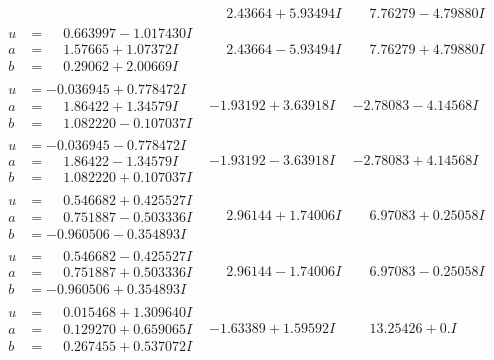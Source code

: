 \documentclass[1p]{elsarticle_modified}
\theoremstyle{definition}
\begin{document}
$$\begin{array}{c|c|c}
 & \phantom{-}2.43664 + 5.93494 I & \phantom{-}7.76279 - 4.79880 I \\ \hline\begin{aligned}
u &= \phantom{-}0.663997 - 1.017430 I \\
a &= \phantom{-}1.57665 + 1.07372 I \\
b &= \phantom{-}0.29062 + 2.00669 I\end{aligned}
 & \phantom{-}2.43664 - 5.93494 I & \phantom{-}7.76279 + 4.79880 I \\ \hline\begin{aligned}
u &= -0.036945 + 0.778472 I \\
a &= \phantom{-}1.86422 + 1.34579 I \\
b &= \phantom{-}1.082220 - 0.107037 I\end{aligned}
 & -1.93192 + 3.63918 I & -2.78083 - 4.14568 I \\ \hline\begin{aligned}
u &= -0.036945 - 0.778472 I \\
a &= \phantom{-}1.86422 - 1.34579 I \\
b &= \phantom{-}1.082220 + 0.107037 I\end{aligned}
 & -1.93192 - 3.63918 I & -2.78083 + 4.14568 I \\ \hline\begin{aligned}
u &= \phantom{-}0.546682 + 0.425527 I \\
a &= \phantom{-}0.751887 - 0.503336 I \\
b &= -0.960506 - 0.354893 I\end{aligned}
 & \phantom{-}2.96144 + 1.74006 I & \phantom{-}6.97083 + 0.25058 I \\ \hline\begin{aligned}
u &= \phantom{-}0.546682 - 0.425527 I \\
a &= \phantom{-}0.751887 + 0.503336 I \\
b &= -0.960506 + 0.354893 I\end{aligned}
 & \phantom{-}2.96144 - 1.74006 I & \phantom{-}6.97083 - 0.25058 I \\ \hline\begin{aligned}
u &= \phantom{-}0.015468 + 1.309640 I \\
a &= \phantom{-}0.129270 + 0.659065 I \\
b &= \phantom{-}0.267455 + 0.537072 I\end{aligned}
 & -1.63389 + 1.59592 I & \phantom{-}13.25426 + 0. I\phantom{ +0.000000I} \\ \hline\begin{aligned}

\end{aligned}
\end{array}$$
\end{document}
